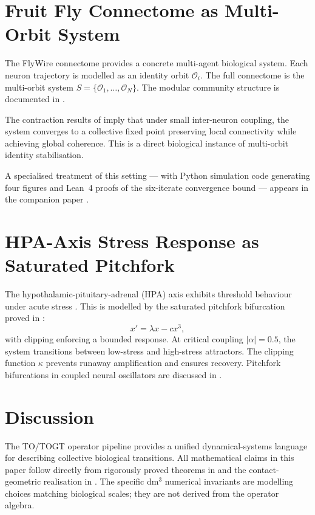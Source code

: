 \documentclass[12pt,a4paper]{article}
\begin{document}
\section{Fruit Fly Connectome as Multi-Orbit System}
\label{sec:connectome}

The FlyWire connectome \cite{Dorkenwald2024} provides a concrete
multi-agent biological system. Each neuron trajectory is modelled as
an identity orbit $\mathcal{O}_{i}$. The full connectome is the
multi-orbit system $S = \{\mathcal{O}_{1},\ldots,\mathcal{O}_{N}\}$.
The modular community structure is documented in \cite{Schlegel2024}.

The contraction results of \cite{Grossi2026_Vol1} imply that under
small inter-neuron coupling, the system converges to a collective
fixed point preserving local connectivity while achieving global
coherence. This is a direct biological instance of multi-orbit
identity stabilisation.

A specialised treatment of this setting --- with Python simulation
code generating four figures and Lean~4 proofs of the six-iterate
convergence bound --- appears in the companion paper
\cite{Grossi2026_FruitFly}.

\section{HPA-Axis Stress Response as Saturated Pitchfork}
\label{sec:hpa}

The hypothalamic-pituitary-adrenal (HPA) axis exhibits threshold
behaviour under acute stress \cite{Bhaskaran2022}. This is modelled
by the saturated pitchfork bifurcation proved in
\cite{Grossi2026_Vol1}:
\[
  x' = \lambda x - c x^{3},
\]
with clipping enforcing a bounded response. At critical coupling
$|\alpha|=0.5$, the system transitions between low-stress and
high-stress attractors. The clipping function $\kappa$ prevents
runaway amplification and ensures recovery. Pitchfork bifurcations
in coupled neural oscillators are discussed in
\cite{PerezCervera2019}.

\section{Discussion}
\label{sec:discussion}

The TO/TOGT operator pipeline provides a unified dynamical-systems
language for describing collective biological transitions. All
mathematical claims in this paper follow directly from rigorously
proved theorems in \cite{Grossi2026_Vol1} and the contact-geometric
realisation in \cite{Grossi2026_Vol2}. The specific dm$^3$ numerical
invariants are modelling choices matching biological scales; they are
not derived from the operator algebra.
\end{document}
